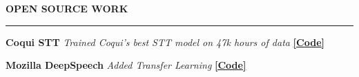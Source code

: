 \documentclass{resume} %
\begin{document}








\vspace{.5cm}
\sectionskip
\MakeUppercase{\textbf{Open Source Work}}
  \sectionlineskip
  \hrule
\vspace{.5cm}

{\textbf{Coqui STT}} {\hfill \textit{Trained Coqui's best STT model on 47k hours of data} {\hspace{2.5cm} \href{https://github.com/coqui-ai/STT/releases/tag/v1.0.0}{\textbf{[Code]}}}} \\\vspace{-.35cm}

{\textbf{Mozilla DeepSpeech}} {\hfill \textit{Added Transfer Learning} {\hspace{2.5cm} \href{https://github.com/mozilla/DeepSpeech/releases/tag/v0.7.0}{\textbf{[Code]}}}} \\\vspace{-.35cm}
\end{document}
